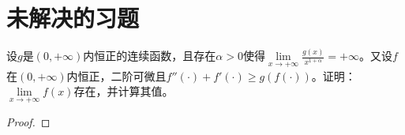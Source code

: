 \documentclass[../../main.tex]{subfiles}
\begin{document}
\section{未解决的习题}

\begin{example}
设$g$是$(0,+\infty)$内恒正的连续函数，且存在$\alpha>0$使得$\lim\limits_{x \to +\infty} \frac{g(x)}{x^{1+\alpha}} = +\infty$。又设$f$在$(0,+\infty)$内恒正，二阶可微且$f''(\cdot) + f'(\cdot) \geqslant g(f(\cdot))$。证明：$\lim\limits_{x \to +\infty} f(x)$存在，并计算其值。
\end{example}
\begin{proof}


\end{proof}
\end{document}
